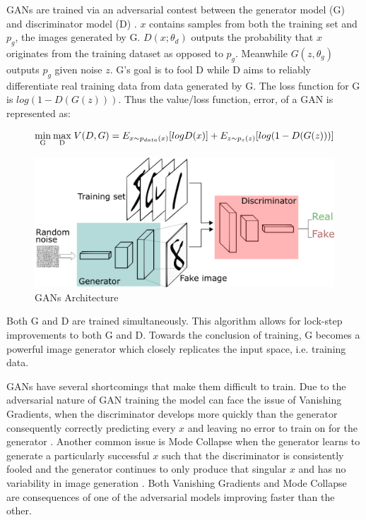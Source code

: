 \documentclass[%
 reprint,
 amsmath,amssymb,
 aps,
]{revtex4-2}
\begin{document}
GANs are trained via an adversarial contest between the generator model (G) and discriminator model (D) \cite{goodfellow2014generative}. $x$ contains samples from both the training set and $p_g$, the images generated by G. $D(x;\theta_d)$ outputs the probability that $x$ originates from the training dataset as opposed to $p_g$. Meanwhile $G(z, \theta_g)$ outputs $p_g$ given noise $z$. G's goal is to fool D while D aims to reliably differentiate real training data from data generated by G. The loss function for G is $log(1 - D(G(z)))$. Thus the value/loss function, error, of a GAN is represented as:
\begin{widetext}
\begin{equation}
\mathrm{\underset{G}{min} \:\underset{D}{max} } \;V (D, G) = E_{x\sim p_{data}(x)} [log D(x)] \\
+ E_{z\sim p_{z}(z)} [log(1 - D(G(z)))]
\end{equation}
\end{widetext}

\begin{figure}[h]
    \includegraphics[width=0.9\columnwidth]{GANs.png}
    \caption{\label{fig:GAN} GANs Architecture \cite{Yan2021}}
\end{figure}



Both G and D are trained simultaneously. This algorithm allows for lock-step improvements to both G and D. Towards the conclusion of training, G becomes a powerful image generator which closely replicates the input space, i.e. training data.


GANs have several shortcomings that make them difficult to train. Due to the adversarial nature of GAN training the model can face the issue of Vanishing Gradients, when the discriminator develops more quickly than the generator consequently correctly predicting every $x$ and leaving no error to train on for the generator \cite{google}. Another common issue is Mode Collapse when the generator learns to generate a particularly successful $x$ such that the discriminator is consistently fooled and the generator continues to only produce that singular $x$ and has no variability in image generation \cite{google}. Both Vanishing Gradients and Mode Collapse are consequences of one of the adversarial models improving faster than the other.
\end{document}
